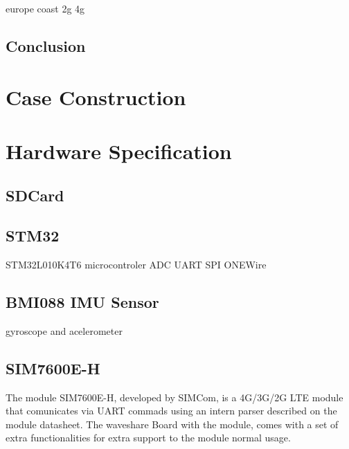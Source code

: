 europe coast
2g 4g


\subsection{Conclusion}
\section{Case Construction}
\section{Hardware Specification}
\subsection{SDCard}
\subsection{STM32}

STM32L010K4T6
microcontroler
ADC
UART
SPI
ONEWire
\subsection{BMI088 IMU Sensor}
gyroscope and acelerometer
\subsection{SIM7600E-H} 
The module SIM7600E-H, developed by SIMCom, is a 4G/3G/2G LTE module that comunicates via UART commads using an intern parser described on the module datasheet. 
The waveshare Board with the module, comes with a set of extra functionalities for extra support to the module normal usage.


